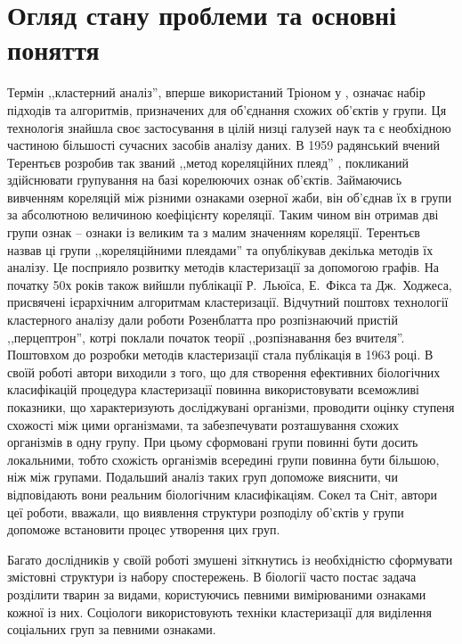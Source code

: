 \chapter{Огляд стану проблеми та основні поняття}\label{ch:01}

Термін ,,кластерний аналіз'', вперше використаний Тріоном у \cite{Tryon:Cluster:1939}, означає набір підходів та алгоритмів, призначених для об'єднання схожих об'єктів у групи. Ця технологія знайшла своє застосування в цілій низці галузей наук та є необхідною частиною більшості сучасних засобів аналізу даних.
В 1959 радянський вчений Терентьєв розробив так званий ,,метод кореляційних плеяд'' \cite{Terentyev}, покликаний здійснювати групування на базі корелюючих ознак об'єктів. Займаючись вивченням кореляцій між різними ознаками озерної жаби, він об'єднав їх в групи за абсолютною величиною коефіцієнту кореляції. Таким чином він отримав дві групи ознак -- ознаки із великим та з малим значенням кореляції. Терентьєв назвав ці групи ,,кореляційними плеядами'' та опублікував декілька методів їх аналізу. Це посприяло розвитку методів кластеризації за допомогою графів. На початку 50х років також вийшли публікації Р.~Льюїса, Е.~Фікса та Дж.~Ходжеса, присвячені ієрархічним алгоритмам кластеризації. Відчутний поштовх технології кластерного аналізу дали роботи Розенблатта про розпізнаючий пристій ,,перцептрон'', котрі поклали початок теорії ,,розпізнавання без вчителя''. Поштовхом до розробки методів кластеризації стала публікація \cite{SokalSneath} в 1963 році. В своїй роботі автори виходили з того, що для створення ефективних біологічних класифікацій процедура кластеризації повинна використовувати всеможливі показники, що характеризують досліджувані організми, проводити оцінку ступеня схожості між цими організмами, та забезпечувати розташування схожих організмів в одну групу. При цьому сформовані групи повинні бути досить локальними, тобто схожість організмів всередині групи повинна бути більшою, ніж між групами. Подальший аналіз таких груп допоможе вияснити, чи відповідають вони реальним біологічним класифікаціям. Сокел та Сніт, автори цеї роботи, вважали, що виявлення структури розподілу об'єктів у групи допоможе встановити процес утворення цих груп.


Багато дослідників у своїй роботі змушені зіткнутись із необхідністю сформувати змістовні структури із набору спостережень. В біології часто постає задача розділити тварин за видами, користуючись певними вимірюваними ознаками кожної із них. Соціологи використовують техніки кластеризації для виділення соціальних груп за певними ознаками. 
